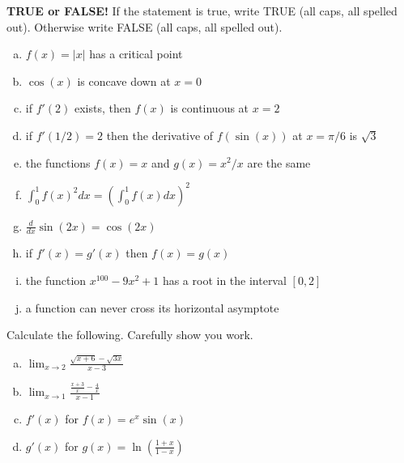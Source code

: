 \documentclass[11pt]{exam}
\theoremstyle{definition}
\begin{document}
\begin{questions}

\addpoints

\question[20]\mbox{}
\textbf{TRUE or FALSE!}
If the statement is true, write TRUE (all caps, all spelled out).
Otherwise write FALSE (all caps, all spelled out).
\begin{enumerate}[(a)]
\item $f(x) = |x|$ has a critical point
\vspace{0.6in}
\item $\cos(x)$ is concave down at $x=0$
\vspace{0.6in}
\item if $f'(2)$ exists, then $f(x)$ is continuous at $x=2$
\vspace{0.6in}
\item if $f'(1/2) = 2$ then the derivative of $f(\sin(x))$ at $x=\pi/6$ is  $\sqrt{3}$
\vspace{0.6in}
\item the functions $f(x) = x$ and $g(x) = x^2/x$ are the same
\vspace{0.6in}
\item $\int_0^1 f(x)^2dx = \left(\int_0^1 f(x) dx\right)^2$
\vspace{0.6in}
\item $\frac{d}{dx}\sin(2x) = \cos(2x)$
\vspace{0.6in}
\item if $f'(x) = g'(x)$ then $f(x) = g(x)$
\vspace{0.6in}
\item the function $x^{100}-9x^2 + 1$ has a root in the interval $[0,2]$
\vspace{0.6in}
\item a function can never cross its horizontal asymptote
\end{enumerate}

\newpage
\question[10]\mbox{}
Calculate the following.  Carefully show you work.
\begin{enumerate}[(a)]
\item $\lim_{x\rightarrow 2}\frac{\sqrt{x+6}-\sqrt{3x}}{x-3}$
\vspace{2in}
\item $\lim_{x\rightarrow 1}\frac{\frac{x+3}{x}-\frac{4}{x}}{x-1}$
\vspace{2in}
\item $f'(x)$ for $f(x) = e^x\sin(x)$
\vspace{2in}
\item $g'(x)$ for $g(x) = \ln\left(\frac{1+x}{1-x}\right)$
\vspace{2in}
\end{enumerate}


\end{questions}
\end{document}
